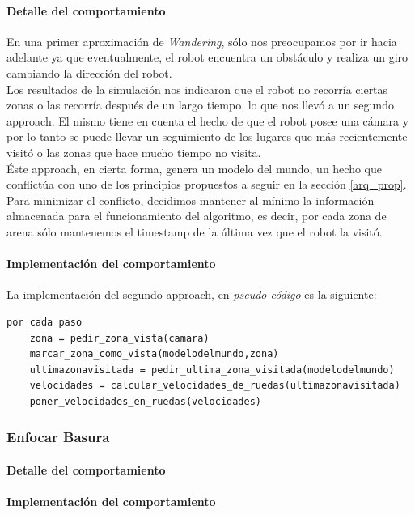 \paragraph{Detalle del comportamiento}
En una primer aproximaci\'on de \emph{Wandering}, s\'olo nos preocupamos por ir hacia adelante
ya que eventualmente, el robot encuentra un obst\'aculo y realiza un giro cambiando la direcci\'on
del robot.
\\
Los resultados de la simulaci\'on nos indicaron que el robot no recorr\'ia ciertas zonas o las recorr\'ia
despu\'es de un largo tiempo, lo que nos llev\'o a un segundo approach. El mismo tiene en cuenta el hecho
de que el robot posee una c\'amara y por lo tanto se puede llevar un seguimiento de los lugares que m\'as
recientemente visit\'o o las zonas que hace mucho tiempo no visita.
\\
\'Este approach, en cierta forma, genera un modelo del mundo, un hecho que conflict\'ua con uno de
los principios propuestos a seguir en la secci\'on \ref{arq_prop}. Para minimizar el conflicto, decidimos
mantener al m\'inimo la informaci\'on almacenada para el funcionamiento del algoritmo, es decir, por cada
zona de arena s\'olo mantenemos el timestamp de la \'ultima vez que el robot la visit\'o.

\paragraph{Implementaci\'on del comportamiento}
La implementaci\'on del segundo approach, en \emph{pseudo-c\'odigo} es la siguiente:
\begin{verbatim}
por cada paso
    zona = pedir_zona_vista(camara)
    marcar_zona_como_vista(modelodelmundo,zona)
    ultimazonavisitada = pedir_ultima_zona_visitada(modelodelmundo)
    velocidades = calcular_velocidades_de_ruedas(ultimazonavisitada)
    poner_velocidades_en_ruedas(velocidades)
\end{verbatim}


\subsubsection{Enfocar Basura}
\label{focus_garbage}
\paragraph{Detalle del comportamiento}
\paragraph{Implementaci\'on del comportamiento}

